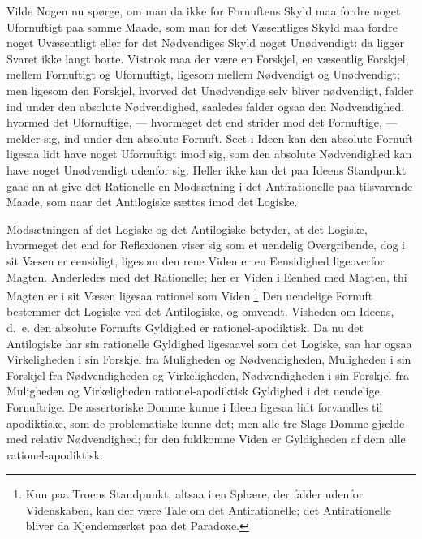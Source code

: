 \documentclass[12pt]{book}
\newcommand{\opage}[1]{\marginnote{\footnotesize\textit{[#1]}}}
\begin{document}
Vilde Nogen nu spørge, om man da ikke for Fornuftens
Skyld maa fordre noget Ufornuftigt paa samme Maade, som
man for det Væsentliges Skyld maa fordre noget Uvæsentligt
eller for det Nødvendiges Skyld noget Unødvendigt: da ligger
\opage{278}Svaret ikke langt borte. Vistnok maa der være en Forskjel,
en væsentlig Forskjel, mellem Fornuftigt og Ufornuftigt, ligesom
mellem Nødvendigt og Unødvendigt; men ligesom den
Forskjel, hvorved det Unødvendige selv bliver nødvendigt, falder
ind under den absolute Nødvendighed, saaledes falder ogsaa den
Nødvendighed, hvormed det Ufornuftige, --- hvormeget det end
strider mod det Fornuftige, --- melder sig, ind under den absolute
Fornuft. Seet i Ideen kan den absolute Fornuft ligesaa lidt
have noget Ufornuftigt imod sig, som den absolute Nødvendighed
kan have noget Unødvendigt udenfor sig. Heller ikke kan det
paa Ideens Standpunkt gaae an at give det Rationelle en
Modsætning i det Antirationelle paa tilsvarende Maade, som
naar det Antilogiske sættes imod det Logiske.

Modsætningen af det Logiske og det Antilogiske betyder,
at det Logiske, hvormeget det end for Reflexionen viser sig som
et uendelig Overgribende, dog i sit Væsen er eensidigt, ligesom
den rene Viden er en Eensidighed ligeoverfor Magten. Anderledes
med det Rationelle; her er Viden i Eenhed med Magten,
thi Magten er i sit Væsen ligesaa rationel som Viden.\footnote{Kun
paa Troens Standpunkt, altsaa i en Sphære, der falder
udenfor Videnskaben, kan der være Tale om det Antirationelle;
det Antirationelle bliver da Kjendemærket paa det Paradoxe.}%
{} Den uendelige Fornuft bestemmer det Logiske ved det Antilogiske,
og omvendt. Visheden om Ideens, d.\ e. den absolute
Fornufts Gyldighed er rationel-apodiktisk. Da nu det Antilogiske
har sin rationelle Gyldighed ligesaavel som det Logiske,
saa har ogsaa Virkeligheden i sin Forskjel fra Muligheden og
Nødvendigheden, Muligheden i sin Forskjel fra Nødvendigheden
og Virkeligheden, Nødvendigheden i sin Forskjel fra Muligheden
og Virkeligheden rationel-apodiktisk Gyldighed i det uendelige
Fornuftrige. De assertoriske Domme kunne i Ideen
ligesaa lidt forvandles til apodiktiske, som de problematiske
kunne det; men alle tre Slags Domme gjælde med relativ
\opage{279}Nødvendighed; for den fuldkomne Viden er Gyldigheden af
dem alle rationel-apodiktisk.
\end{document}
